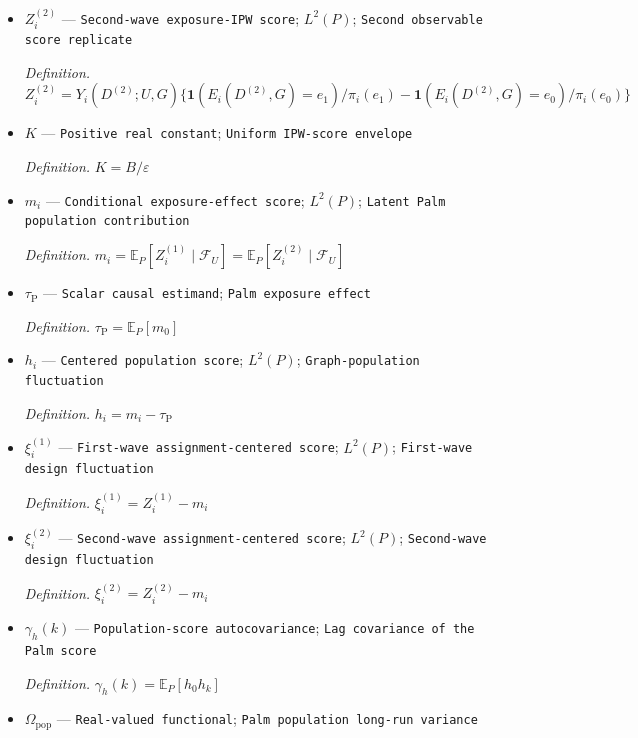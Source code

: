 \documentclass{article}
\begin{document}
\begin{itemize}
  \item \(Z_i^{(2)}\) --- \texttt{Second-\allowbreak{}wave exposure-\allowbreak{}IPW score}; \(L^2(P)\); \texttt{Second observable score replicate}
  \par\smallskip\noindent\emph{Definition.} \(Z_i^{(2)}=Y_i(D^{(2)};U,G)\{\mathbf 1(E_i(D^{(2)},G)=e_1)/\pi_i(e_1)-\mathbf 1(E_i(D^{(2)},G)=e_0)/\pi_i(e_0)\}\)
  \item \(K\) --- \texttt{Positive real constant}; \texttt{Uniform IPW-\allowbreak{}score envelope}
  \par\smallskip\noindent\emph{Definition.} \(K=B/\varepsilon\)
  \item \(m_i\) --- \texttt{Conditional exposure-\allowbreak{}effect score}; \(L^2(P)\); \texttt{Latent Palm population contribution}
  \par\smallskip\noindent\emph{Definition.} \(m_i=\mathbb E_P[Z_i^{(1)}\mid\mathcal F_U]=\mathbb E_P[Z_i^{(2)}\mid\mathcal F_U]\)
  \item \(\tau_{\mathrm P}\) --- \texttt{Scalar causal estimand}; \texttt{Palm exposure effect}
  \par\smallskip\noindent\emph{Definition.} \(\tau_{\mathrm P}=\mathbb E_P[m_0]\)
  \item \(h_i\) --- \texttt{Centered population score}; \(L^2(P)\); \texttt{Graph-\allowbreak{}population fluctuation}
  \par\smallskip\noindent\emph{Definition.} \(h_i=m_i-\tau_{\mathrm P}\)
  \item \(\xi_i^{(1)}\) --- \texttt{First-\allowbreak{}wave assignment-\allowbreak{}centered score}; \(L^2(P)\); \texttt{First-\allowbreak{}wave design fluctuation}
  \par\smallskip\noindent\emph{Definition.} \(\xi_i^{(1)}=Z_i^{(1)}-m_i\)
  \item \(\xi_i^{(2)}\) --- \texttt{Second-\allowbreak{}wave assignment-\allowbreak{}centered score}; \(L^2(P)\); \texttt{Second-\allowbreak{}wave design fluctuation}
  \par\smallskip\noindent\emph{Definition.} \(\xi_i^{(2)}=Z_i^{(2)}-m_i\)
  \item \(\gamma_h(k)\) --- \texttt{Population-\allowbreak{}score autocovariance}; \texttt{Lag covariance of the Palm score}
  \par\smallskip\noindent\emph{Definition.} \(\gamma_h(k)=\mathbb E_P[h_0h_k]\)
  \item \(\Omega_{\mathrm{pop}}\) --- \texttt{Real-\allowbreak{}valued functional}; \texttt{Palm population long-\allowbreak{}run variance}

\end{itemize}
\end{document}
